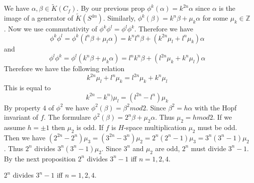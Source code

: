\documentclass[../Thesis.tex]{subfiles}
\begin{document}
\begin{myproof}
We have $\alpha, \beta \in \tilde{K}(C_f)$. By our previous prop $\phi^k(\alpha) = k^{2n}\alpha$ since $\alpha$ is the image of a generator of $\tilde{K}(S^{4n})$. Similarly, $\phi^k(\beta) = k^n\beta + \mu_k \alpha$ for some $\mu_k \in \mathbb{Z}$. Now we use commutativity of $\phi^k\phi^l = \phi^l\phi^k$. Therefore we have
\begin{equation}
\phi^k\phi^l = \phi^k(l^n \beta + \mu_l\alpha) = k^nl^n\beta + (k^{2n}\mu_l + l^n\mu_k)\alpha
\end{equation}
and
\begin{equation}
\phi^l\phi^k = \phi^l(k^n \beta + \mu_k\alpha) = l^nk^n\beta + (l^{2n}\mu_k + k^n\mu_l)\alpha
\end{equation}
Therefore we have the following relation
\begin{equation}
k^{2n}\mu_l + l^n\mu_k = l^{2n}\mu_k + k^n\mu_l
\end{equation}
This is equal to
\begin{equation}
k^{2n} - k^n)\mu_l = (l^{2n}-l^n)\mu_k
\end{equation}
By property $4$ of $\phi^2$ we have $\phi^2(\beta) = \beta^2 mod 2$. Since $\beta^2 = h\alpha$ with the Hopf invariant of $f$. The formulare $\phi^2(\beta) = 2^n\beta + \mu_2\alpha$. Thus $\mu_2 = h mod 2$. If we assume $h = \pm 1$ then $\mu_2$ is odd. If $f$ is $H$-space multiplication $\mu_2$ must be odd. Then we have $(2^{2n}-2^n)\mu_3 = (3^{2n} - 3^n)\mu_2 = 2^n(2^n-1)\mu_3 = 3^n(3^n-1)\mu_2$. Thus $2^n$ divides $3^n(3^n-1)\mu_2$. Since $3^n$ and $\mu_2$ are odd, $2^n$ must divide $3^n-1$. By the next proposition $2^n$ divides $3^n-1$ iff $n = 1,2,4$.
\end{myproof}
\begin{prop}
$2^n$ divides $3^n-1$ iff $ n = 1,2 ,4$.
\end{prop}
\end{document}
